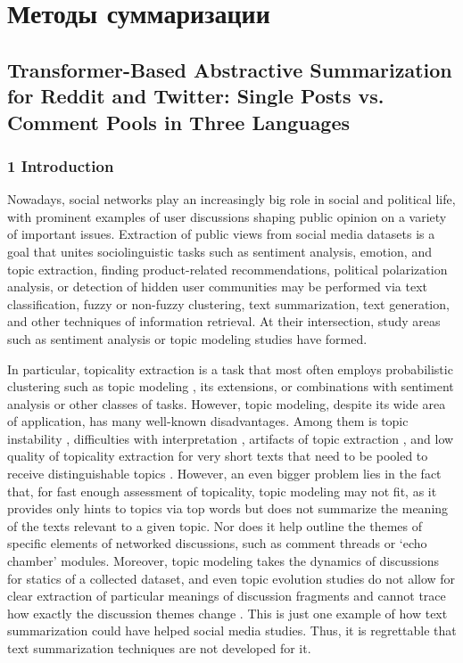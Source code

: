 \section{Методы суммаризации}\label{sec:ch5/sect4}

\subsection{Transformer-Based Abstractive Summarization for Reddit and Twitter: Single Posts vs. Comment Pools in Three Languages}\label{subsec:ch5/sec4/sub1}

\subsubsection{1 Introduction}

Nowadays, social networks play an increasingly big role in social and political life, with prominent examples of user discussions shaping public opinion on a variety of important issues. Extraction of public views from social media datasets is a goal that unites sociolinguistic tasks such as sentiment analysis, emotion, and topic extraction, finding product-related recommendations, political polarization analysis, or detection of hidden user communities may be performed via text classification, fuzzy or non-fuzzy clustering, text summarization, text generation, and other techniques of information retrieval. At their intersection, study areas such as sentiment analysis or topic modeling studies have formed.

In particular, topicality extraction is a task that most often employs probabilistic clustering such as topic modeling \cite{KherwaBansal,PotapenkoVorotsov,Bodrunova2021}, its extensions, or combinations with sentiment analysis \cite{RanaCheahLetchmunan} or other classes of tasks. However, topic modeling, despite its wide area of application, has many well-known disadvantages. Among them is topic instability \cite{BlekanovTarasovMaksimov,KoltcovKoltsovaNikolenko2014,BodrunovaKoltcovKoltsova}, difficulties with interpretation \cite{BodrunovaBlekanovKukarkin}, artifacts of topic extraction \cite{BoydGraberMimnoNewman}, and low quality of topicality extraction for very short texts that need to be pooled to receive distinguishable topics \cite{QiangQianLi}. However, an even bigger problem lies in the fact that, for fast enough assessment of topicality, topic modeling may not fit, as it provides only hints to topics via top words but does not summarize the meaning of the texts relevant to a given topic. Nor does it help outline the themes of specific elements of networked discussions, such as comment threads or ‘echo chamber’ modules. Moreover, topic modeling takes the dynamics of discussions for statics of a collected dataset, and even topic evolution studies do not allow for clear extraction of particular meanings of discussion fragments and cannot trace how exactly the discussion themes change \cite{SmoliarovaBodrunovaYakunin}. This is just one example of how text summarization could have helped social media studies. Thus, it is regrettable that text summarization techniques are not developed for it.

